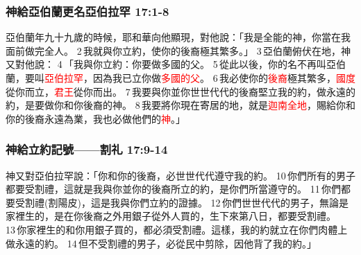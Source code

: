 

\subsubsection{神給亞伯蘭更名亞伯拉罕 17:1-8}
\label{sec:YaBoLanGaiMing}
亞伯蘭年九十九歲的時候，耶和華向他顯現，對他說：「我是全能的神，你當在我面前做完全人。 2 我就與你立約，使你的後裔極其繁多。」 3 亞伯蘭俯伏在地，神又對他說： 4 「我與你立約：你要做多國的父。 5 從此以後，你的名不再叫亞伯蘭，要叫\textcolor{red}{亞伯拉罕}，因為我已立你做\textcolor{red}{多國的父}。 6 我必使你的\textcolor{red}{後裔}極其繁多，\textcolor{red}{國度}從你而立，\textcolor{red}{君王}從你而出。 7 我要與你並你世世代代的後裔堅立我的約，做永遠的約，是要做你和你後裔的神。 8 我要將你現在寄居的地，就是\textcolor{red}{迦南全地}，賜給你和你的後裔永遠為業，我也必做他們的\textcolor{red}{神}。」


\subsubsection{神給立約記號——割礼 17:9-14}
\label{sec:GodGiveGeLi}
神又對亞伯拉罕說：「你和你的後裔，必世世代代遵守我的約。 10 你們所有的男子都要受割禮，這就是我與你並你的後裔所立的約，是你們所當遵守的。 11 你們都要受割禮(割陽皮)，這是我與你們立約的證據。 12 你們世世代代的男子，無論是家裡生的，是在你後裔之外用銀子從外人買的，生下來第八日，都要受割禮。 13 你家裡生的和你用銀子買的，都必須受割禮。這樣，我的約就立在你們肉體上做永遠的約。 14 但不受割禮的男子，必從民中剪除，因他背了我的約。」



